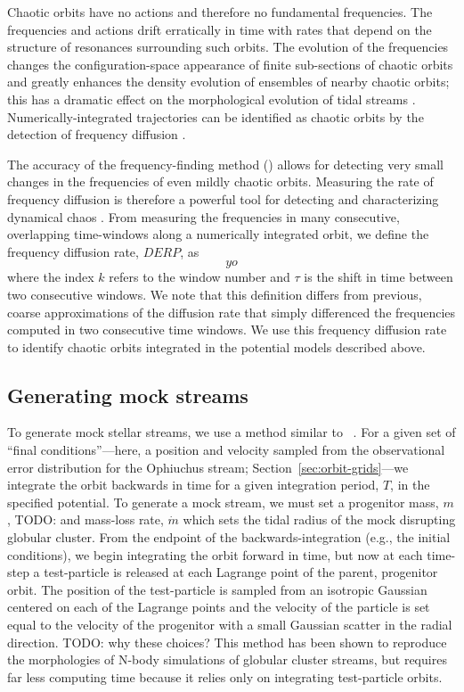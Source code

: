 \documentclass[letterpaper,12pt,preprint]{aastex}
\newcommand{\todo}[1]{{\color{red} TODO: #1}}
\begin{document}
Chaotic orbits have no actions and therefore no fundamental frequencies. The frequencies and actions drift erratically in time with rates that depend on the structure of resonances surrounding such orbits. The evolution of the frequencies changes the configuration-space appearance of finite sub-sections of chaotic orbits and greatly enhances the density evolution of ensembles of nearby chaotic orbits; this has a dramatic effect on the morphological evolution of tidal streams \citep[e.g.,][]{apw15-chaos}. Numerically-integrated trajectories can be identified as chaotic orbits by the detection of frequency diffusion \citep[e.g.,][]{laskar96, valluri98}. 

The accuracy of the frequency-finding method (\superfreq) allows for detecting very small changes in the frequencies of even mildly chaotic orbits. Measuring the rate of frequency diffusion is therefore a powerful tool for detecting and characterizing dynamical chaos \citep[e.g.,][]{many}. From measuring the frequencies in many consecutive, overlapping time-windows along a numerically integrated orbit, we define the frequency diffusion rate, $DERP$, as
\begin{equation}
	yo
\end{equation}
where the index $k$ refers to the window number and $\tau$ is the shift in time between two consecutive windows. We note that this definition differs from previous, coarse approximations of the diffusion rate that simply differenced the frequencies computed in two consecutive time windows. We use this frequency diffusion rate to identify chaotic orbits integrated in the potential models described above.

\subsection{Generating mock streams}\label{sec:mocks}

To generate mock stellar streams, we use a method similar to \streakline\ \citep{kuepper12}. For a given set of ``final conditions''---here, a position and velocity sampled from the observational error distribution for the Ophiuchus stream; Section~\ref{sec:orbit-grids}---we integrate the orbit backwards in time for a given integration period, $T$, in the specified potential. To generate a mock stream, we must set a progenitor mass, $m$, \todo{and mass-loss rate, $\dot{m}$} which sets the tidal radius of the mock disrupting globular cluster. From the endpoint of the backwards-integration (e.g., the initial conditions), we begin integrating the orbit forward in time, but now at each time-step a test-particle is released at each Lagrange point of the parent, progenitor orbit. The position of the test-particle is sampled from an isotropic Gaussian centered on each of the Lagrange points and the velocity of the particle is set equal to the velocity of the progenitor with a small Gaussian scatter in the radial direction. \todo{why these choices?} This method has been shown to reproduce the morphologies of N-body simulations of globular cluster streams, but requires far less computing time because it relies only on integrating test-particle orbits.
\end{document}
